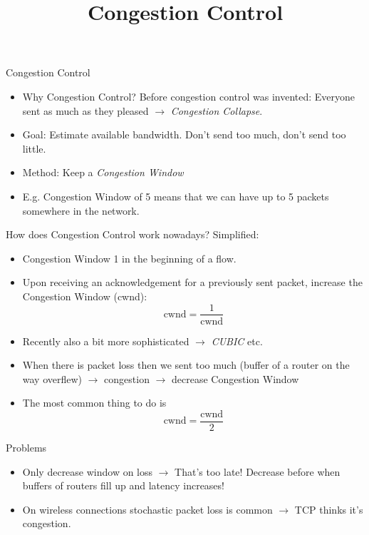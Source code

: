 \documentclass[11pt]{beamer}
\title{Congestion Control}
\begin{document}
\begin{frame}
\titlepage
\end{frame}


\begin{frame}{Congestion Control}
\begin{itemize}
\item Why Congestion Control? Before congestion control was invented: Everyone sent as much as they pleased $\rightarrow$ \textit{Congestion Collapse}.
\item Goal: Estimate available bandwidth. Don't send too much, don't send too little.
\item Method: Keep a \textit{Congestion Window}
\item E.g. Congestion Window of 5 means that we can have up to 5 packets somewhere in the network.
\end{itemize}
\end{frame}

\begin{frame}{How does Congestion Control work nowadays?}
Simplified:
\begin{itemize}
\item Congestion Window 1 in the beginning of a flow.
\item Upon receiving an acknowledgement for a previously sent packet, increase the Congestion Window (cwnd): $$\text{cwnd} = \frac{1}{\text{cwnd}}$$
\item Recently also a bit more sophisticated $\rightarrow$ \textit{CUBIC} etc. 
\item When there is packet loss then we sent too much (buffer of a router on the way overflew) $\rightarrow$ congestion $\rightarrow$ decrease Congestion Window
\item The most common thing to do is $$\text{cwnd} = \frac{\text{cwnd}}{2}$$
\end{itemize}
\end{frame}

\begin{frame}{Problems}
\begin{itemize}
\item Only decrease window on loss $\rightarrow$ That's too late! Decrease before when buffers of routers fill up and latency increases!
\item On wireless connections stochastic packet loss is common $\rightarrow$ TCP thinks it's congestion.
\end{itemize}
\end{frame}
\end{document}
